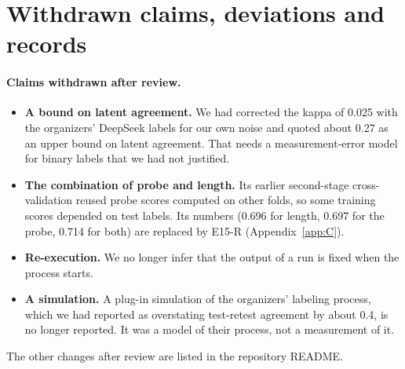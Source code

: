 \section{Withdrawn claims, deviations and records}\label{app:D}

\paragraph{Claims withdrawn after review.}
\begin{itemize}
\item \textbf{A bound on latent agreement.} We had corrected the kappa of 0.025 with the organizers' DeepSeek labels for our own noise and quoted about 0.27 as an upper bound on latent agreement. That needs a measurement-error model for binary labels that we had not justified.
\item \textbf{The combination of probe and length.} Its earlier second-stage cross-validation reused probe scores computed on other folds, so some training scores depended on test labels. Its numbers (0.696 for length, 0.697 for the probe, 0.714 for both) are replaced by E15-R (Appendix~\ref{app:C}).
\item \textbf{Re-execution.} We no longer infer that the output of a run is fixed when the process starts.
\item \textbf{A simulation.} A plug-in simulation of the organizers' labeling process, which we had reported as overstating test-retest agreement by about 0.4, is no longer reported. It was a model of their process, not a measurement of it.
\end{itemize}
The other changes after review are listed in the repository README.


